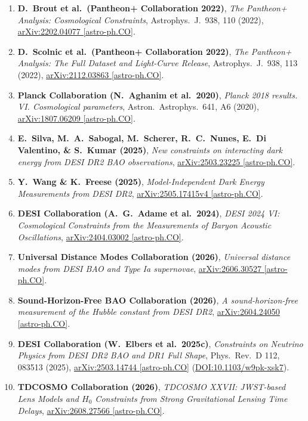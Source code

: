 \documentclass[11pt,letterpaper]{article}
\begin{document}
\begin{enumerate}
    \item \textbf{D.\ Brout et al.\ (Pantheon+ Collaboration 2022)}, \emph{The Pantheon+ Analysis: Cosmological Constraints}, Astrophys.\ J.\ 938, 110 (2022), \href{https://arxiv.org/abs/2202.04077}{arXiv:2202.04077 [astro-ph.CO]}.
    \item \textbf{D.\ Scolnic et al.\ (Pantheon+ Collaboration 2022)}, \emph{The Pantheon+ Analysis: The Full Dataset and Light-Curve Release}, Astrophys.\ J.\ 938, 113 (2022), \href{https://arxiv.org/abs/2112.03863}{arXiv:2112.03863 [astro-ph.CO]}.
    \item \textbf{Planck Collaboration (N.\ Aghanim et al.\ 2020)}, \emph{Planck 2018 results. VI. Cosmological parameters}, Astron.\ Astrophys.\ 641, A6 (2020), \href{https://arxiv.org/abs/1807.06209}{arXiv:1807.06209 [astro-ph.CO]}.
    \item \textbf{E.\ Silva, M.\ A.\ Sabogal, M.\ Scherer, R.\ C.\ Nunes, E.\ Di Valentino, \& S.\ Kumar (2025)}, \emph{New constraints on interacting dark energy from DESI DR2 BAO observations}, \href{https://arxiv.org/pdf/2503.23225}{arXiv:2503.23225 [astro-ph.CO]}.
    \item \textbf{Y.\ Wang \& K.\ Freese (2025)}, \emph{Model-Independent Dark Energy Measurements from DESI DR2}, \href{https://arxiv.org/html/2505.17415v4}{arXiv:2505.17415v4 [astro-ph.CO]}.
    \item \textbf{DESI Collaboration (A.\ G.\ Adame et al.\ 2024)}, \emph{DESI 2024 VI: Cosmological Constraints from the Measurements of Baryon Acoustic Oscillations}, \href{https://arxiv.org/abs/2404.03002}{arXiv:2404.03002 [astro-ph.CO]}.
    \item \textbf{Universal Distance Modes Collaboration (2026)}, \emph{Universal distance modes from DESI BAO and Type Ia supernovae}, \href{https://arxiv.org/pdf/2606.30527}{arXiv:2606.30527 [astro-ph.CO]}.
    \item \textbf{Sound-Horizon-Free BAO Collaboration (2026)}, \emph{A sound-horizon-free measurement of the Hubble constant from DESI DR2}, \href{https://arxiv.org/pdf/2604.24050}{arXiv:2604.24050 [astro-ph.CO]}.
    \item \textbf{DESI Collaboration (W.\ Elbers et al.\ 2025c)}, \emph{Constraints on Neutrino Physics from DESI DR2 BAO and DR1 Full Shape}, Phys.\ Rev.\ D 112, 083513 (2025), \href{https://arxiv.org/abs/2503.14744}{arXiv:2503.14744 [astro-ph.CO]} (\href{https://link.aps.org/doi/10.1103/w9pk-xsk7}{DOI:10.1103/w9pk-xsk7}).
    \item \textbf{TDCOSMO Collaboration (2026)}, \emph{TDCOSMO XXVII: JWST-based Lens Models and $H_0$ Constraints from Strong Gravitational Lensing Time Delays}, \href{https://www.alphaxiv.org/ja/abs/2608.27566}{arXiv:2608.27566 [astro-ph.CO]}.

\end{enumerate}
\end{document}
